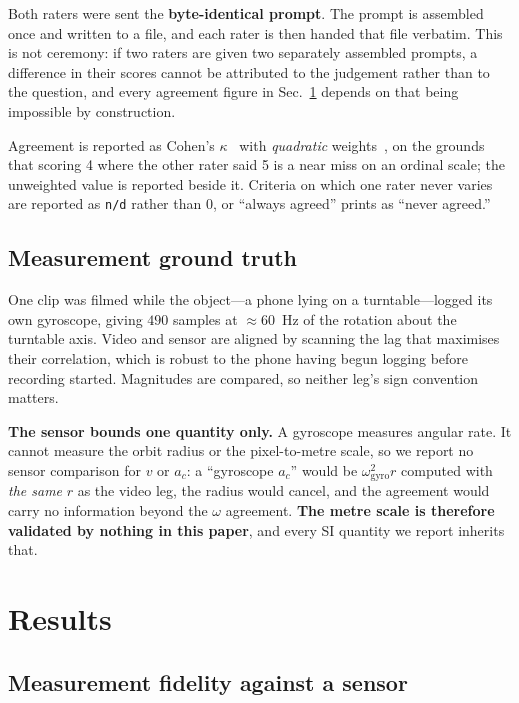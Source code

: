 \documentclass[conference]{IEEEtran}
\newcommand{\ac}{a_{c}}
\begin{document}
Both raters were sent the \textbf{byte-identical prompt}. The prompt is
assembled once and written to a file, and each rater is then handed that file
verbatim. This is not ceremony: if two raters are given two separately
assembled prompts, a difference in their scores cannot be attributed to the
judgement rather than to the question, and every agreement figure in
Sec.~\ref{sec:results} depends on that being impossible by construction.

Agreement is reported as Cohen's $\kappa$~\cite{cohen} with \emph{quadratic}
weights~\cite{cohenw}, on the
grounds that scoring 4 where the other rater said 5 is a near miss on an
ordinal scale; the unweighted value is reported beside it. Criteria on which
one rater never varies are reported as \texttt{n/d} rather than $0$, or
``always agreed'' prints as ``never agreed.''

\subsection{Measurement ground truth}

One clip was filmed while the object---a phone lying on a turntable---logged
its own gyroscope, giving $490$ samples at $\approx$60~Hz of the rotation about
the turntable axis. Video and sensor are aligned by scanning the lag that
maximises their correlation, which is robust to the phone having begun logging
before recording started. Magnitudes are compared, so neither leg's sign
convention matters.

\textbf{The sensor bounds one quantity only.} A gyroscope measures angular
rate. It cannot measure the orbit radius or the pixel-to-metre scale, so we
report no sensor comparison for $v$ or $\ac$: a ``gyroscope $\ac$'' would be
$\omega_{\text{gyro}}^{2} r$ computed with \emph{the same} $r$ as the video
leg, the radius would cancel, and the agreement would carry no information
beyond the $\omega$ agreement. \textbf{The metre scale is therefore validated
by nothing in this paper}, and every SI quantity we report inherits that.

\section{Results}
\label{sec:results}

\subsection{Measurement fidelity against a sensor}
\end{document}
